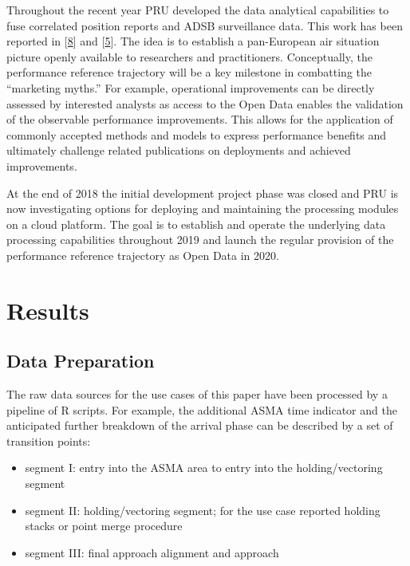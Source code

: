 \documentclass[conference,final,a4paper,]{IEEEtran}
\providecommand{\tightlist}{%
  \setlength{\itemsep}{0pt}\setlength{\parskip}{0pt}}
\begin{document}
Throughout the recent year PRU developed the data analytical capabilities to fuse correlated position reports and ADSB surveillance data.
This work has been reported in {[}\protect\hyperlink{ref-koelle_open_2017}{8}{]} and {[}\protect\hyperlink{ref-spinielli_2018}{5}{]}. The idea is to establish a pan-European air situation picture openly available to researchers and practitioners.
Conceptually, the performance reference trajectory will be a key milestone in combatting the ``marketing myths.''
For example, operational improvements can be directly assessed by interested analysts as access to the Open Data enables the validation of the observable performance improvements. This allows for the application of commonly accepted methods and models to express performance benefits and ultimately challenge related publications on deployments and achieved improvements.

At the end of 2018 the initial development project phase was closed and PRU is now investigating options for deploying and maintaining the processing modules on a cloud platform.
The goal is to establish and operate the underlying data processing capabilities throughout 2019 and launch the regular provision of the performance reference trajectory as Open Data in 2020.

\hypertarget{results}{%
\section{Results}\label{results}}

\hypertarget{data-preparation}{%
\subsection{Data Preparation}\label{data-preparation}}

The raw data sources for the use cases of this paper have been processed by a pipeline of R scripts.
For example, the additional ASMA time indicator and the anticipated further breakdown of the arrival phase can be described by a set of transition points:

\begin{itemize}
\tightlist
\item
  segment I: entry into the ASMA area to entry into the holding/vectoring segment
\item
  segment II: holding/vectoring segment; for the use case reported holding stacks or point merge procedure
\item
  segment III: final approach alignment and approach
\end{itemize}
\end{document}
